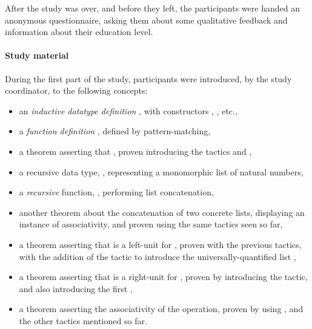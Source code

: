 After the study was over, and before they left, the participants were handed an
anonymous questionnaire, asking them about some qualitative feedback and
information about their education level.

\paragraph{Study material}

During the first part of the study, participants were introduced, by the study
coordinator, to the following concepts:

\begin{itemize}

\item an \emph{inductive datatype definition} , with constructors
, , etc.,

\item a \emph{function definition} , defined by
pattern-matching,

\item a theorem asserting that , proven
introducing the tactics  and ,

\item a recursive data type, , representing a monomorphic
list of natural numbers,

\item a \emph{recursive} function, , performing list
concatenation,

\item another theorem about the concatenation of two concrete lists, displaying
an instance of associativity, and proven using the same tactics seen so far,

\item a theorem asserting that  is a left-unit for
, proven with the previous tactics, with the addition of the
 tactic to introduce the universally-quantified list
,

\item a theorem asserting that  is a right-unit for
, proven by introducing the  tactic, and
also introducing the first ,

\item a theorem asserting the associativity of the  operation,
proven by using , and the other tactics mentioned so far.

\end{itemize}

